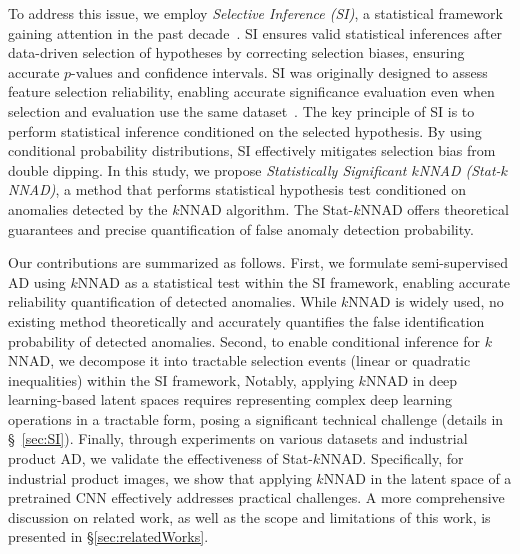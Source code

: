 To address this issue, we employ \emph{Selective Inference (SI)}, a statistical framework gaining attention in the past decade~\citep{fithian2014optimal,taylor2015statistical,lee2016exact}.
%
SI ensures valid statistical inferences after data-driven selection of hypotheses by correcting selection biases, ensuring accurate \( p \)-values and confidence intervals.
%
SI was originally designed to assess feature selection reliability, enabling accurate significance evaluation even when selection and evaluation use the same dataset~\citep{lee2016exact,tibshirani2016exact,duy2022more}.
%
The key principle of SI is to perform statistical inference conditioned on the selected hypothesis.
%
By using conditional probability distributions, SI effectively mitigates selection bias from double dipping.
%
In this study, we propose \emph{Statistically Significant $k$NNAD (Stat-$k$NNAD)}, a method that performs statistical hypothesis test conditioned on anomalies detected by the $k$NNAD algorithm.
%
The Stat-$k$NNAD offers theoretical guarantees and precise quantification of false anomaly detection probability.

Our contributions are summarized as follows.
%
First, we formulate semi-supervised AD using $k$NNAD as a statistical test within the SI framework, enabling accurate reliability quantification of detected anomalies.
%
While $k$NNAD is widely used, no existing method theoretically and accurately quantifies the false identification probability of detected anomalies.
%
Second, to enable conditional inference for $k$NNAD, we decompose it into tractable selection events (linear or quadratic inequalities) within the SI framework, Notably, applying $k$NNAD in deep learning-based latent spaces requires representing complex deep learning operations in a tractable form, posing a significant technical challenge (details in \S~\ref{sec:SI}). 
%
Finally, through experiments on various datasets and industrial product AD, we validate the effectiveness of Stat-$k$NNAD. Specifically, for industrial product images, we show that applying $k$NNAD in the latent space of a pretrained CNN effectively addresses practical challenges.
%
A more comprehensive discussion on related work, as well as the scope and limitations of this work, is presented in \S\ref{sec:relatedWorks}.
